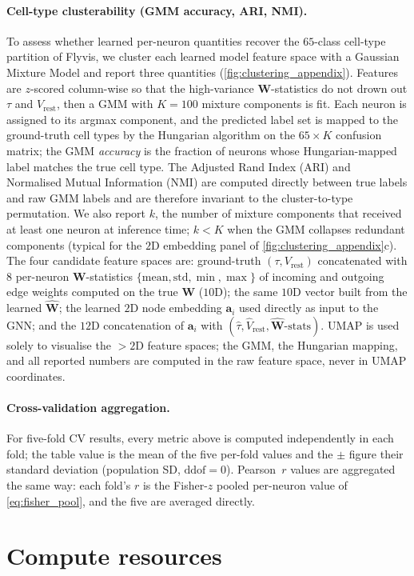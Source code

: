 \documentclass{article}
\begin{document}
\paragraph{Cell-type clusterability (GMM accuracy, ARI, NMI).}
To assess whether learned per-neuron quantities recover the $65$-class
cell-type partition of Flyvis, we cluster each learned model feature space with a Gaussian Mixture Model and report three quantities
(\cref{fig:clustering_appendix}). Features are $z$-scored
column-wise so that the high-variance $\mathbf{W}$-statistics do not
drown out $\tau$ and $V_{\mathrm{rest}}$, then a GMM with $K=100$
mixture components is fit. Each neuron is assigned to its argmax
component, and the predicted label set is mapped to the ground-truth
cell types by the Hungarian algorithm on the $65 \times K$ confusion
matrix; the GMM \emph{accuracy} is the fraction of neurons whose
Hungarian-mapped label matches the true cell type. The Adjusted Rand
Index (ARI) and Normalised Mutual Information (NMI) are computed
directly between true labels and raw GMM labels and are therefore
invariant to the cluster-to-type permutation. We also report $k$, the
number of mixture components that received at least one neuron at
inference time; $k < K$ when the GMM collapses redundant components
(typical for the $2$D embedding panel of
\cref{fig:clustering_appendix}c). The four candidate feature spaces are: ground-truth $(\tau, V_{\mathrm{rest}})$ concatenated with $8$ per-neuron $\mathbf{W}$-statistics
$\{\mathrm{mean}, \mathrm{std}, \min, \max\}$ of incoming and outgoing
edge weights computed on the true $\mathbf{W}$ ($10$D); the same
$10$D vector built from the learned $\hat{\mathbf{W}}$; the
learned $2$D node embedding $\mathbf{a}_i$ used directly as input to
the GNN; and the $12$D concatenation of $\mathbf{a}_i$ with
$(\hat{\tau}, \hat{V}_{\mathrm{rest}},
\hat{\mathbf{W}}\text{-stats})$. UMAP is used solely to visualise
the $>2$D feature spaces; the GMM, the Hungarian mapping, and all
reported numbers are computed in the raw feature space, never in UMAP
coordinates.

\paragraph{Cross-validation aggregation.}
For five-fold CV results, every metric above is computed independently
in each fold; {\color{revised}the table value is the mean of the five per-fold values and the
$\pm$ figure their standard deviation (population SD, $\mathrm{ddof}=0$). Pearson~$r$
values are aggregated the same way: each fold's $r$ is the Fisher-$z$ pooled per-neuron value of
\cref{eq:fisher_pool}, and the five are averaged directly.}





\section{Compute resources}




\newpage
\end{document}
